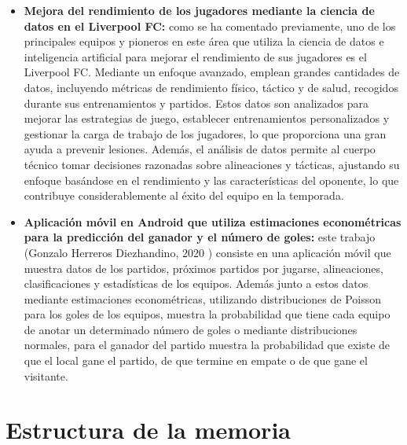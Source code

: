 \begin{itemize}
\item \textbf{Mejora del rendimiento de los jugadores mediante la ciencia de datos en el Liverpool FC:} como se ha comentado previamente, uno de los principales equipos y pioneros en este área que utiliza la ciencia de datos e inteligencia artificial para mejorar el rendimiento de sus jugadores es el Liverpool FC. Mediante un enfoque avanzado, emplean grandes cantidades de datos, incluyendo métricas de rendimiento físico, táctico y de salud, recogidos durante sus entrenamientos y partidos. Estos datos son analizados para mejorar las estrategias de juego, establecer entrenamientos personalizados y gestionar la carga de trabajo de los jugadores, lo que proporciona una gran ayuda a prevenir lesiones. Además, el análisis de datos permite al cuerpo técnico tomar decisiones razonadas sobre alineaciones y tácticas, ajustando su enfoque basándose en el rendimiento y las características del oponente, lo que contribuye considerablemente al éxito del equipo en la temporada.

\item \textbf{Aplicación móvil en Android que utiliza estimaciones econométricas para la predicción del ganador y el número de goles:} este trabajo (Gonzalo Herreros Diezhandino, 2020 \cite{tfg-ref}) consiste en una aplicación móvil que muestra datos de los partidos, próximos partidos por jugarse, alineaciones, clasificaciones y estadísticas de los equipos. Además junto a estos datos mediante estimaciones econométricas, utilizando distribuciones de Poisson para los goles de los equipos, muestra la probabilidad que tiene cada equipo de anotar un determinado número de goles o mediante distribuciones normales, para el ganador del partido muestra la probabilidad que existe de que el local gane el partido, de que termine en empate o de que gane el visitante. 

\end{itemize}
















\section{Estructura de la memoria}

